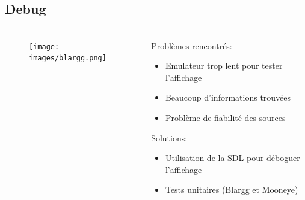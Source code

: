 \documentclass{beamer}
\begin{document}
\subsection{Debug}
\begin{frame}
	\frametitle{\secname}
  \framesubtitle{\subsecname}
  \begin{columns}[T]
		\begin{column}{.30\textwidth}
			\begin{figure}
				\texttt{[image: images/blargg.png]}
			\end{figure}
		\end{column}
		\begin{column}{.70\textwidth}
      Problèmes rencontrés:
      \begin{itemize}
        \item Emulateur trop lent pour tester l'affichage
        \item Beaucoup d'informations trouvées
        \item Problème de fiabilité des sources
      \end{itemize}
      Solutions:
      \begin{itemize}
        \item Utilisation de la SDL pour déboguer l'affichage
        \item Tests unitaires (Blargg et Mooneye)
      \end{itemize}
		\end{column}
	\end{columns}
\end{frame}

\end{document}
